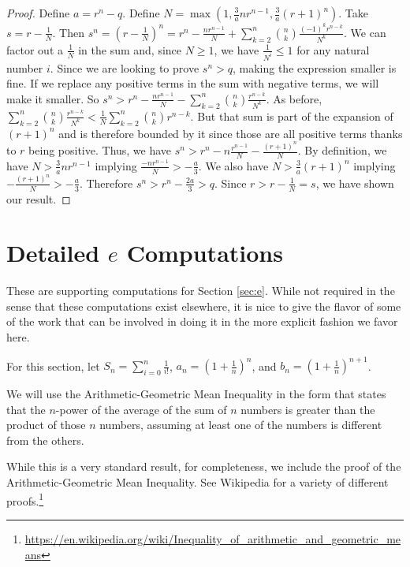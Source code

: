 \documentclass[12pt]{article}
\begin{document}
\begin{proof}
Define $a = r^n - q$. Define $N =  \max(1,\tfrac{3}{a}n r^{n-1}, \tfrac{3}{a}(r+1)^n)$.  Take $s = r - \tfrac{1}{N}$. Then $s^n = (r- \tfrac{1}{N})^n = r^n - \tfrac{n r^{n-1}}{N} + \sum_{k=2}^{n} \binom{n}{k} \tfrac{ (-1)^{k} r^{n-k}}{N^{k}}$. We can factor out a $\tfrac{1}{N}$ in the sum and, since $N \geq 1$, we have $\tfrac{1}{N^i} \leq 1$ for any natural number $i$. Since we are looking to prove $s^n > q$, making the expression smaller is fine. If we replace any positive terms in the sum with negative terms, we will make it smaller. So $s^n > r^n - \tfrac{n r^{n-1}}{N} - \sum_{k=2}^{n} \binom{n}{k} \tfrac{r^{n-k}}{N^{k}}$. As before, $\sum_{k=2}^{n} \binom{n}{k} \tfrac{r^{n-k}}{N^{k}} < \tfrac{1}{N} \sum_{k=2}^{n} \binom{n}{k} r^{n-k}$.  But that sum is part of the expansion of $(r+1)^n$ and is therefore bounded by it since those are all positive terms thanks to $r$ being positive. Thus, we have $s^n > r^n - n \tfrac{r^{n-1}}{N} - \tfrac{ (r+1)^n }{N}$.  By definition, we have $N > \tfrac{3}{a} n r^{n-1}$ implying $ \tfrac{-n r^{n-1}}{N} > -\tfrac{a}{3}$. We also have $N > \tfrac{3}{a} (r+1)^n$ implying $ -\tfrac{(r+1)^n}{N} > -\tfrac{a}{3}$. Therefore $s^n > r^n - \tfrac{2 a}{3} > q$. Since $r> r - \frac{1}{N} = s$, we have shown our result. 
\end{proof}

\section{Detailed \texorpdfstring{$e$}{e} Computations}\label{app:e}

These are supporting computations for Section \ref{sec:e}. While not required in the sense that these computations exist elsewhere, it is nice to give the flavor of some of the work that can be involved in doing it in the more explicit fashion we favor here. 

For this section, let $S_n = \sum_{i=0}^n \frac{1}{i!}$, $a_n = (1+\frac{1}{n})^{n}  $, and $b_n = (1+\frac{1}{n})^{n+1}$.

We will use the Arithmetic-Geometric Mean Inequality in the form that states that the $n$-power of the average of the sum of $n$ numbers is greater than the product of those $n$ numbers, assuming at least one of the numbers is different from the others. 

While this is a very standard result, for completeness, we include the proof of the Arithmetic-Geometric Mean Inequality. See Wikipedia for a variety of different proofs.\footnote{\url{https://en.wikipedia.org/wiki/Inequality_of_arithmetic_and_geometric_means}}
\end{document}
